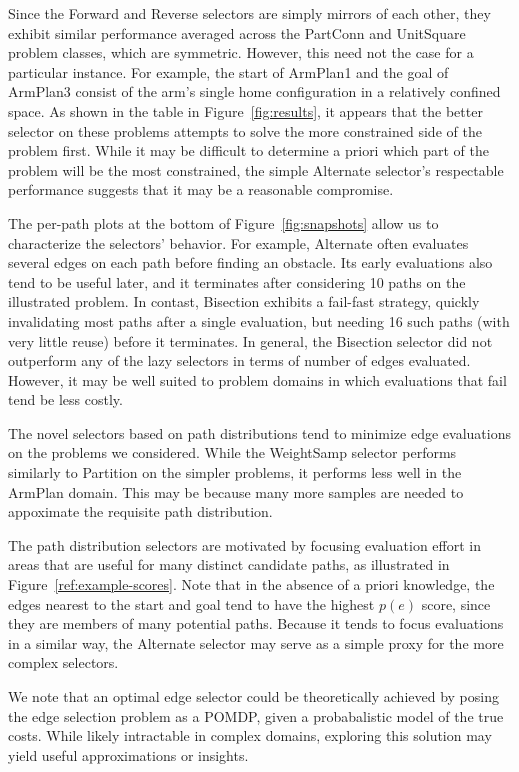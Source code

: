 \documentclass[nobib]{tufte-book}
\begin{document}
Since the Forward and Reverse selectors are simply mirrors of each
other,
they exhibit similar performance
averaged across the PartConn and UnitSquare problem classes,
which are symmetric.
However,
this need not the case for a particular instance.
For example,
the start of ArmPlan1 and the goal of ArmPlan3 consist
of the arm's single home configuration in a relatively confined space.
As shown in the table in
Figure~\ref{fig:results},
it appears that the better selector on these problems attempts
to solve the more constrained side of the problem first.
While it may be difficult to determine a priori which part of the
problem will be the most constrained,
the simple Alternate selector's respectable performance
suggests that it may be a reasonable compromise.

The per-path plots at the bottom of Figure~\ref{fig:snapshots}
allow us to characterize the selectors' behavior.
For example,
Alternate often evaluates several edges on each path before finding
an obstacle.
Its early evaluations also tend to be useful later,
and it terminates after considering 10 paths on the illustrated problem.
In contast, Bisection exhibits a fail-fast strategy,
quickly invalidating most paths after a single evaluation,
but needing 16 such paths (with very little reuse)
before it terminates.
In general, the Bisection selector did not outperform any of the
lazy selectors in terms of number of edges evaluated.
However,
it may be well suited to problem domains in which
evaluations that fail tend be less costly.

The novel selectors based on path distributions tend to minimize
edge evaluations on the problems we considered.
While the WeightSamp selector performs similarly to Partition on the
simpler problems,
it performs less well in the ArmPlan domain.
This may be because many more samples are needed to appoximate
the requisite path distribution.

The path distribution selectors are motivated by focusing evaluation
effort in areas that are useful for many distinct candidate paths,
as illustrated in Figure~\ref{ref:example-scores}.
Note that in the absence of a priori knowledge,
the edges nearest to the start and goal tend to have the highest
$p(e)$ score,
since they are members of many potential paths.
Because it tends to focus evaluations in a similar way,
the Alternate selector may serve as a simple proxy for the
more complex selectors.

We note that
an optimal edge selector could be theoretically achieved by posing the
edge selection problem as a POMDP,
given a probabalistic model of the true costs.
While likely intractable in complex domains,
exploring this solution may yield useful approximations or insights.
\end{document}
